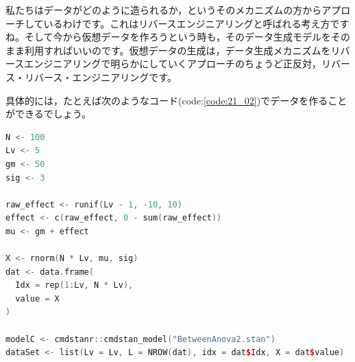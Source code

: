 \documentclass{ltjsbook}
\begin{document}
私たちはデータがどのように造られるか，というそのメカニズムの方からアプローチしているわけです。これはリバースエンジニアリングと呼ばれる考え方ですね。そして今から仮想データを作ろうという時も，そのデータ生成モデルをそのまま利用すればいいのです。仮想データの生成は，データ生成メカニズムをリバースエンジニアリングで明らかにしていくアプローチのちょうど正反対，リバース・リバース・エンジニアリングです。

具体的には，たとえば次のようなコード(code:\ref{code:21_02})でデータを作ることができるでしょう。
\begin{lstlisting}[language=c++,label={code:21_02},caption={リバースエンジニアリング}]
N <- 100
Lv <- 5
gm <- 50
sig <- 3

raw_effect <- runif(Lv - 1, -10, 10)
effect <- c(raw_effect, 0 - sum(raw_effect))
mu <- gm + effect

X <- rnorm(N * Lv, mu, sig)
dat <- data.frame(
  Idx = rep(1:Lv, N * Lv),
  value = X
)

modelC <- cmdstanr::cmdstan_model("BetweenAnova2.stan")
dataSet <- list(Lv = Lv, L = NROW(dat), idx = dat$Idx, X = dat$value)
\end{lstlisting}
\end{document}

